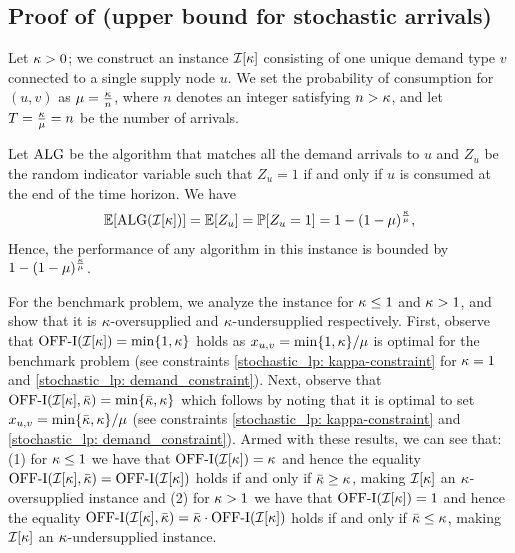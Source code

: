 \subsection*{Proof of  (upper bound for stochastic arrivals)}
\label{ssec: stochastic_upper_bound}
Let $\kappa > 0$; we construct an instance $\mathcal I[\kappa]$ consisting of one unique demand type $v$ connected to a single supply node $u$. We set the probability of consumption for $(u,v)$ as $\mu= \frac{\kappa}{n}$, where $n$ denotes an integer satisfying $n > \kappa$, and let   $T = \frac{\kappa}{\mu}=n$ be the number of arrivals.

Let $\mathrm{ALG}$ be the algorithm that matches all the demand arrivals to $u$ and $Z_u$ be the random indicator variable such that $Z_u = 1$ if and only if $u$ is consumed at the end of the time horizon. We have
\begin{align*}
    \mathbb E[\mathrm{ALG}(\mathcal I[\kappa])] =  \mathbb E[Z_u] = \mathbb P[\text{$Z_u = 1$}]
    = 1-(1-\mu)^{\frac{\kappa}{\mu}},
\end{align*}
Hence, the performance of any algorithm in this instance is bounded by $1-(1-\mu)^{\frac{\kappa}{\mu}}$. 

For the benchmark problem, we analyze the instance for $\kappa \leq 1$ and $\kappa> 1$, and show that it is $\kappa$-oversupplied and $\kappa$-undersupplied respectively. First, observe that $\mathrm{\mathrm{OFF}}\textrm{-}\mathrm{I}(\mathcal I[\kappa]) = \min \{1,\kappa\}$ holds as $x_{u,v} = \min\{1,\kappa\}/\mu$ is optimal for the benchmark problem (see constraints \eqref{stochastic_lp: kappa-constraint} for $\kappa = 1$ and \eqref{stochastic_lp: demand_constraint}). Next, observe that  $\mathrm{\mathrm{OFF}}\textrm{-}\mathrm{I}(\mathcal I[\kappa], \bar{\kappa}) = \min\{\bar{\kappa},\kappa\}$ which follows by noting that it is optimal to set $x_{u,v} = \min\{\bar{\kappa},\kappa\}/\mu$ (see constraints \eqref{stochastic_lp: kappa-constraint} and \eqref{stochastic_lp: demand_constraint}). Armed with these results, we can see that: (1) for $\kappa \leq 1$ we have that $\mathrm{\mathrm{OFF}}\textrm{-}\mathrm{I}(\mathcal I[\kappa]) = \kappa$ and hence the equality $\mathrm{\mathrm{OFF}}\textrm{-}\mathrm{I}(\mathcal I[\kappa], \bar{\kappa}) = \mathrm{\mathrm{OFF}}\textrm{-}\mathrm{I}(\mathcal I[\kappa])$ holds if and only if $\bar{\kappa} \geq \kappa$, making $\mathcal I[\kappa]$ an $\kappa$-oversupplied instance and (2) for $\kappa > 1$ we have that $\mathrm{\mathrm{OFF}}\textrm{-}\mathrm{I}(\mathcal I[\kappa]) = 1$ and hence the equality $\mathrm{\mathrm{OFF}}\textrm{-}\mathrm{I}(\mathcal I[\kappa], \bar{\kappa}) = \bar{\kappa} \cdot \mathrm{\mathrm{OFF}}\textrm{-}\mathrm{I}(\mathcal I[\kappa])$ holds if and only if $\bar{\kappa} \leq \kappa$, making $\mathcal I[\kappa]$ an $\kappa$-undersupplied instance.

